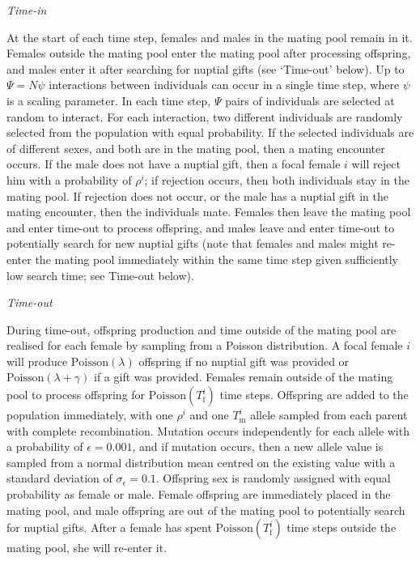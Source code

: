 \documentclass[
]{article}
\begin{document}
\emph{Time-in}

At the start of each time step, females and males in the mating pool
remain in it. Females outside the mating pool enter the mating pool
after processing offspring, and males enter it after searching for
nuptial gifts (see `Time-out' below). Up to \(\Psi = N\psi\)
interactions between individuals can occur in a single time step, where
\(\psi\) is a scaling parameter. In each time step, \(\Psi\) pairs of
individuals are selected at random to interact. For each interaction,
two different individuals are randomly selected from the population with
equal probability. If the selected individuals are of different sexes,
and both are in the mating pool, then a mating encounter occurs. If the
male does not have a nuptial gift, then a focal female \(i\) will reject
him with a probability of \(\rho^{i}\); if rejection occurs, then both
individuals stay in the mating pool. If rejection does not occur, or the
male has a nuptial gift in the mating encounter, then the individuals
mate. Females then leave the mating pool and enter time-out to process
offspring, and males leave and enter time-out to potentially search for
new nuptial gifts (note that females and males might re-enter the mating
pool immediately within the same time step given sufficiently low search
time; see Time-out below).

\emph{Time-out}

During time-out, offspring production and time outside of the mating
pool are realised for each female by sampling from a Poisson
distribution. A focal female \(i\) will produce
\(\mathrm{Poisson}(\lambda)\) offspring if no nuptial gift was provided
or \(\mathrm{Poisson}(\lambda + \gamma)\) if a gift was provided.
Females remain outside of the mating pool to process offspring for
\(\mathrm{Poisson}(T^{i}_{\mathrm{f}})\) time steps. Offspring are added
to the population immediately, with one \(\rho^{i}\) and one
\(T^{i}_{\mathrm{m}}\) allele sampled from each parent with complete
recombination. Mutation occurs independently for each allele with a
probability of \(\epsilon = 0.001\), and if mutation occurs, then a new
allele value is sampled from a normal distribution mean centred on the
existing value with a standard deviation of \(\sigma_{\epsilon} = 0.1\).
Offspring sex is randomly assigned with equal probability as female or
male. Female offspring are immediately placed in the mating pool, and
male offspring are out of the mating pool to potentially search for
nuptial gifts. After a female has spent
\(\mathrm{Poisson}(T^{i}_{\mathrm{f}})\) time steps outside the mating
pool, she will re-enter it.
\end{document}
